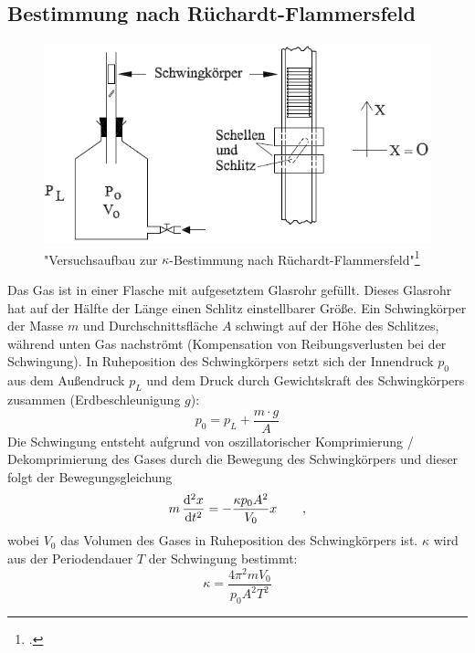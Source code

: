 \subsection{Bestimmung nach Rüchardt-Flammersfeld}
\begin{figure}[h]
  \centering
  \includegraphics[width=.7\textwidth]{res/ruechardt}
  \caption{"Versuchsaufbau zur $\kappa$-Bestimmung nach Rüchardt-Flammersfeld"\footcite{anleitung-ss2015}}
  \label{fig:ruechardt}
\end{figure}
Das Gas ist in einer Flasche mit aufgesetztem Glasrohr gefüllt. Dieses Glasrohr hat auf der Hälfte der Länge einen Schlitz einstellbarer Größe.
Ein Schwingkörper der Masse $m$ und Durchschnittsfläche $A$ schwingt auf der Höhe des Schlitzes, während unten Gas nachströmt (Kompensation von Reibungsverlusten bei der Schwingung).
In Ruheposition des Schwingkörpers setzt sich der Innendruck $p_0$ aus dem Außendruck $p_L$ und dem Druck durch Gewichtskraft des Schwingkörpers zusammen (Erdbeschleunigung $g$):
\begin{equation}
	p_0=p_L+\frac{m\cdot g}{A}
\label{eq:p0}
\end{equation}
Die Schwingung entsteht aufgrund von oszillatorischer Komprimierung / Dekomprimierung des Gases durch die Bewegung des Schwingkörpers und dieser folgt der Bewegungsgleichung
\begin{equation}
	m\,\frac{\mathrm{d}^2 x}{\mathrm{d} t^2}=-\frac{\kappa p_0 A^2}{V_0}x\qquad ,
\label{eq:bwgl}
\end{equation}
wobei $V_0$ das Volumen des Gases in Ruheposition des Schwingkörpers ist. $\kappa$ wird aus der Periodendauer $T$ der Schwingung bestimmt:
\begin{equation}
	\kappa=\frac{4\pi^2 m V_0}{p_0 A^2 T^2}
\label{eq:ruechardt}
\end{equation}
